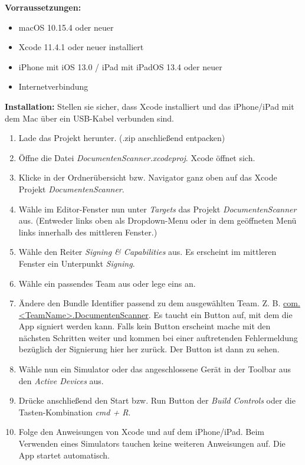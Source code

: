\documentclass[notables, nomenclature, oneside, 150]{HSMW-Thesis}
\begin{document}
	\textbf{Vorraussetzungen:}
	\begin{itemize}
		\item macOS 10.15.4 oder neuer
		\item Xcode 11.4.1 oder neuer installiert
		\item iPhone mit iOS 13.0 / iPad mit iPadOS 13.4 oder neuer
		\item Internetverbindung
	\end{itemize}
	
	\textbf{Installation:}
	Stellen sie sicher, dass Xcode installiert und das iPhone/iPad mit dem Mac über ein USB-Kabel verbunden sind.
	\begin{enumerate}
		\item Lade das Projekt herunter. (.zip anschließend entpacken)
		\item Öffne die Datei \textit{DocumentenScanner.xcodeproj}. Xcode öffnet sich.
		\item Klicke in der Ordnerübersicht bzw. Navigator ganz oben auf das Xcode Projekt \textit{DocumentenScanner}.
		\item Wähle im Editor-Fenster nun unter \textit{Targets} das Projekt \textit{DocumentenScanner} aus. (Entweder links oben als Dropdown-Menu oder in dem geöffneten Menü links innerhalb des mittleren Fenster.)
		\item Wähle den Reiter \textit{Signing \& Capabilities} aus. Es erscheint im mittleren Fenster ein Unterpunkt \textit{Signing}.
		\item Wähle ein passendes Team aus oder lege eins an.
		\item Ändere den Bundle Identifier passend zu dem ausgewählten Team. Z. B. \url{com.<TeamName>.DocumentenScanner}. Es taucht ein Button auf, mit dem die App signiert werden kann. Falls kein Button erscheint mache mit den nächsten Schritten weiter und kommen bei einer auftretenden Fehlermeldung bezüglich der Signierung hier her zurück. Der Button ist dann zu sehen.
		\item Wähle nun ein Simulator oder das angeschlossene Gerät in der Toolbar aus den \textit{Active Devices} aus.
		\item Drücke anschließend den Start bzw. Run Button der \textit{Build Controls} oder die Tasten-Kombination \textit{cmd + R}.
		\item Folge den Anweisungen von Xcode und auf dem iPhone/iPad. Beim Verwenden eines Simulators tauchen keine weiteren Anweisungen auf. Die App startet automatisch. 
	\end{enumerate}
	
\end{document}
